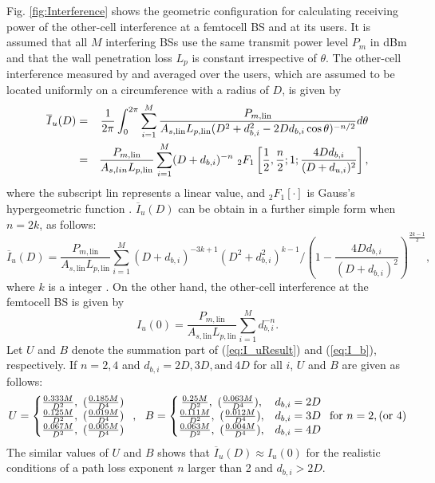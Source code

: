 \documentclass[draftclsnofoot,12pt,onecolumn]{IEEEtran}
\begin{document}
\appendix[]
Fig. \ref{fig:Interference} shows the geometric configuration for
calculating receiving power of the other-cell interference at a
femtocell BS and at its users. It is assumed that all $M$
interfering BSs use the same transmit power level $P_m$ in dBm and
that the wall penetration loss $L_p$ is constant irrespective of
$\theta$. The other-cell interference measured by and averaged over
the users, which are assumed to be located uniformly on a
circumference with a radius of $D$, is given by
\begin{eqnarray}\label{eq:I_u}
\overline{I}_u(D)&=&\frac{1}{2\pi}\int_{0}^{2\pi}
\sum_{i=1}^{M}\frac{P_{m,\mathrm{lin}}}{A_{s,\mathrm{lin}}L_{p,\mathrm{lin}}
(D^2+d_{b,i}^2-2Dd_{b,i}\cos\theta)^{-n/2}} d\theta \cr
&=&\frac{P_{m,\mathrm{lin}}}{A_{s,lin}L_{p,\mathrm{lin}}}
\sum_{i=1}^{M}(D+d_{b,i})^{-n}~
_2F_1\left[\frac{1}{2},\frac{n}{2};1;\frac{4Dd_{b,i}}{(D+d_{u,i})^2}\right],
\end{eqnarray}
where the subscript $\mathrm{lin}$ represents a linear value, and
$_2F_1[\cdot]$ is Gauss's hypergeometric function \cite{HyperGeo}.
$\overline{I}_u(D)$ can be obtain in a further simple form when
$n=2k$, as follows:
\begin{equation}\label{eq:I_uResult}
\overline{I}_u(D)=\frac{P_{m,\mathrm{lin}}}{A_{s,\mathrm{lin}}L_{p,\mathrm{lin}}}
\sum_{i=1}^{M}(D+d_{b,i})^{-3k+1}(D^2+d_{b,i}^2)^{k-1}
\Big/\left(1-\frac{4Dd_{b,i}}{(D+d_{b,i})^2}\right)^{\frac{2k-1}{2}},
\end{equation}
where $k$ is a integer \cite{HyperGeo}. On the other hand, the
other-cell interference at the femtocell BS is given by
\begin{equation}\label{eq:I_b}
I_u(0)=\textstyle{\frac{P_{m,\mathrm{lin}}}{A_{s,\mathrm{lin}}L_{p,\mathrm{lin}}}\sum_{i=1}^{M}d_{b,i}^{-n}}.
\end{equation}
Let $U$ and $B$ denote the summation part of (\ref{eq:I_uResult})
and (\ref{eq:I_b}), respectively. If $n=2,4$ and $d_{b,i}=2D,
3D,\textrm{and}~4D$ for all $i$, $U$ and $B$ are given as follows:
\begin{equation}\label{eq:UB2} U=\left\{\begin{array}{@{\hskip0pt} ccc @{\hskip0pt}}
\frac{0.333M}{D^2}, ~(\frac{0.185M}{D^4}) \cr \frac{0.125M}{D^2},
~(\frac{0.019M}{D^4}) \cr \frac{0.067M}{D^2}, ~(\frac{0.005M}{D^4})
\end{array}\right.,~~
B=\left\{\begin{array}{@{\hskip0pt} ccc @{\hskip0pt}}
\frac{0.25M}{D^2}, ~(\frac{0.063M}{D^4}), & d_{b,i}=2D \cr
\frac{0.111M}{D^2}, ~(\frac{0.012M}{D^4}), & d_{b,i}=3D \cr
\frac{0.063M}{D^2}, ~(\frac{0.004M}{D^4}), & d_{b,i}=4D
\end{array}\right. \textrm{for}~n=2,(\textrm{or }4)
\end{equation}
The similar values of $U$ and $B$ shows that $\overline{I}_u(D)\approx I_u(0)$ for the realistic conditions of a
path loss exponent $n$ larger than 2 and $d_{b,i}>2D$.
\end{document}
